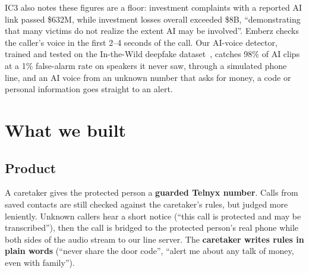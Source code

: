 \documentclass[11pt]{article}
\begin{document}
IC3 also notes these figures are a floor: investment complaints with a reported AI link passed \$632M, while investment losses overall exceeded \$8B, ``demonstrating that many victims do not realize the extent AI may be involved''. Emberz checks the caller's voice in the first 2--4 seconds of the call. Our AI-voice detector, trained and tested on the In-the-Wild deepfake dataset~\cite{itw}, catches 98\% of AI clips at a 1\% false-alarm rate on speakers it never saw, through a simulated phone line, and an AI voice from an unknown number that asks for money, a code or personal information goes straight to an alert.

\section{What we built}
\subsection{Product}
A caretaker gives the protected person a \textbf{guarded Telnyx number}. Calls from saved contacts are still checked against the caretaker's rules, but judged more leniently. Unknown callers hear a short notice (``this call is protected and may be transcribed''), then the call is bridged to the protected person's real phone while both sides of the audio stream to our line server. The \textbf{caretaker writes rules in plain words} (``never share the door code'', ``alert me about any talk of money, even with family'').
\end{document}
